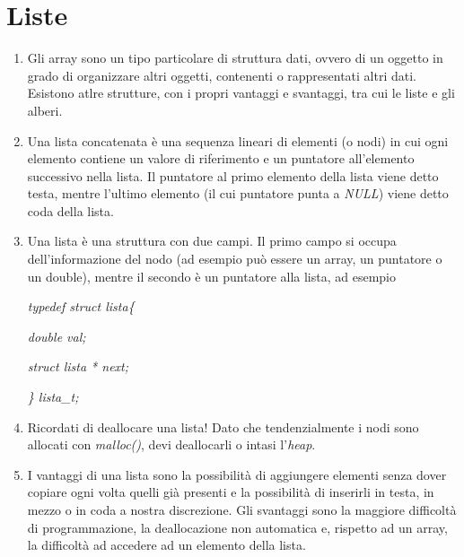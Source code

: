 \documentclass[a4paper,11pt]{article}
\begin{document}
\section{Liste}
\begin{enumerate}[resume]
	\item Gli array sono un tipo particolare di struttura dati, ovvero di un oggetto in grado di organizzare altri oggetti, contenenti o rappresentati altri dati. Esistono atlre strutture, con i propri vantaggi e svantaggi, tra cui le liste e gli alberi.
	\item Una lista concatenata è una sequenza lineari di elementi (o nodi) in cui ogni elemento contiene un valore di riferimento e un puntatore all'elemento successivo nella lista. Il puntatore al primo elemento della lista viene detto testa, mentre l'ultimo elemento (il cui puntatore punta a \textit{NULL}) viene detto coda della lista.
	\item Una lista è una struttura con due campi. Il primo campo si occupa dell'informazione del nodo (ad esempio può essere un array, un puntatore o un double), mentre il secondo è un puntatore alla lista, ad esempio
	
	\noindent\textit{typedef struct lista\{}
		
	\noindent \textit{double val;}
	
	\noindent \textit{struct lista * next;}
	
	\noindent \textit{\} lista\_t;}
	\item Ricordati di deallocare una lista! Dato che tendenzialmente i nodi sono allocati con \textit{malloc()}, devi deallocarli o intasi l'\textit{heap}.
	\item I vantaggi di una lista sono la possibilità di aggiungere elementi senza dover copiare ogni volta quelli già presenti e la possibilità di inserirli in testa, in mezzo o in coda a nostra discrezione. Gli svantaggi sono la maggiore difficoltà di programmazione, la deallocazione non automatica e, rispetto ad un array, la difficoltà ad accedere ad un elemento della lista.	
\end{enumerate}
\end{document}
